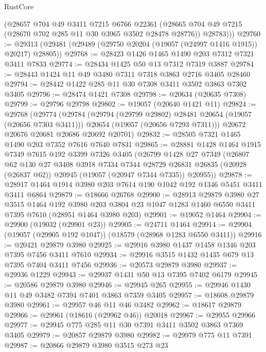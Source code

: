 \begin{lexlean}{RustCore}
\begin{coremodule}
        (@28657
          @704
          @49
          @3411
          @7215
          @6766
          @22361
          (@28665 @704 @49 @7215 (@28670 @702 @285 @11 @30 @3965 @3502 @28478 @28776))
          @28783)))
@29760 := @29313 (@29481 (@29489 (@29750 @20204 (@19057 (@24997 @1416 @1915)) @20217) @28805))
@29768 := @28423 @1426 @1465 @1490 @203 @7312 @7321 @3411 @7833
@29774 := @28434 @1425 @50 @13 @7312 @7319 @3887
@29784 := @28443 @1424 @11 @49 @3480 @7311 @7318 @3863 @2716 @3405 @28460
@29794 := @28442 @1422 @285 @11 @30 @7308 @3411 @3502 @3863 @7302 @3405
@29796 := @28474 @1421 @7308
@29798 := @20634 (@20635 @7308)
@29799 := @29796 @29798
@29802 := @19057 (@20640 @1421 @11)
@29824 := @29768
    (@29774
      (@29784
        (@29794 (@29799 @29802) @28481 @20654 (@19057 (@20656 @7303 @3411)))
        @20654
        (@19057 (@20656 @7293 @7311)))
      @20672
      @20676
      @20681
      @20686
      @20692
      @20701)
@29832 := @28505 @7321 @1465 @1490 @203 @7352 @7616 @7640 @7831
@29865 := @28881
    @1428
    @1464
    @1915
    @7349
    @7615
    @192
    @3399
    @7326
    @3405
    (@26799
      @1428
      @27
      @7349
      (@26807
        @62
        @130
        @27
        @3408
        @3918
        @7334
        @7344
        @28729
        @26831
        @26835
        (@20928 (@26837 @62))
        @20945
        (@19057 (@20947 @7344 @7335))
        @20955))
@29878 := @28917 @1464 @1914 @3980 @203 @7614 @190 @1042 @192 @1346 @5451 @3411 @3411 @6864
@29879 := @18666 @26768
@29900 := @28913
    @29879
    @3980
    @27
    @3515
    @1464
    @192
    @3980
    @203
    @3804
    @23
    @1047
    @1283
    @1460
    @6550
    @3411
    @7395
    @7610
    (@28951 @1464 @3980 @203)
@29901 := @19052 @1464
@29904 := @29900 (@19032 (@29901 @23))
@29905 := @24711 @1464
@29914 := @29904 (@19057 (@29905 @192 @1047)) (@18579 (@28968 @1283 @6550 @3411))
@29916 := @20421 @29879 @3980
@29925 := @29916 @3980 @1437 @1458 @1346 @203 @7395 @7456 @3411 @7610
@29934 := @29916 @3515 @1432 @1435 @679 @13 @7395 @7404 @3411 @7456
@29936 := @20573 @29879 @3980
@29937 := @29936 @1229
@29943 := @29937 @1431 @50 @13 @7395 @7402 @6179
@29945 := @20586 @29879 @3980
@29946 := @29945 @265
@29955 := @29946 @1430 @11 @49 @3482 @7394 @7401 @3863 @7359 @3405
@29957 := @18608 @29879 @3980
@29961 := @29957 @46 @11 @46 @3482
@29962 := @18617 @29879
@29966 := @29961 (@18616 (@29962 @46)) @20018
@29967 := @29955 @29966
@29977 := @29945 @775 @285 @11 @30 @7391 @3411 @3502 @3863 @7369 @3405
@29979 := @20857 @29879 @3980
@29982 := @29979 @775 @11 @7391
@29987 := @20866 @29879 @3980 @3515 @273 @23

\end{coremodule}
\end{lexlean}
